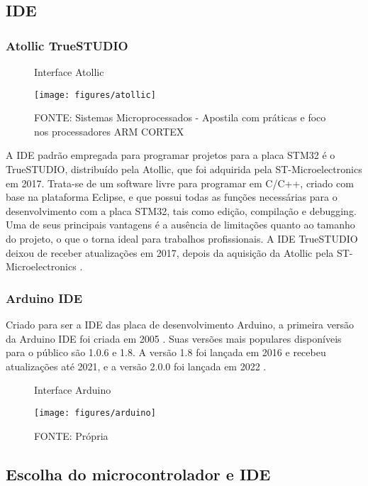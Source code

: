 \subsection{IDE}

\subsubsection{Atollic TrueSTUDIO}

\begin{figure}[ht]
	\centering
	\caption{Interface Atollic}
	\texttt{[image: figures/atollic]}
	\caption*{FONTE: Sistemas Microprocessados - Apostila com práticas e foco nos processadores ARM CORTEX \cite{apostila_microprossados}}
\end{figure}

A IDE padrão empregada para programar projetos para a placa STM32 é o TrueSTUDIO,
distribuído pela Atollic, que foi adquirida pela ST-Microelectronics em 2017.
Trata-se de um software livre para programar em C/C++, criado com base na
plataforma Eclipse, e que possui todas as funções necessárias para o
desenvolvimento com a placa STM32, tais como edição, compilação e debugging.
Uma de seus principais vantagens é a ausência de limitações quanto ao tamanho
do projeto, o que o torna ideal para trabalhos profissionais. A IDE TrueSTUDIO
deixou de receber atualizações em 2017, depois da aquisição da Atollic pela 
ST-Microelectronics \cite{apostila_microprossados}.


\subsubsection{Arduino IDE}

Criado para ser a IDE das placa de desenvolvimento Arduino, a primeira
versão da Arduino IDE foi criada em 2005 \cite{arduino_id_history}.
Suas versões mais populares disponíveis para o público são 1.0.6 e 1.8. 
A versão 1.8 foi lançada em 2016 e recebeu atualizações até 2021, 
e a versão 2.0.0 foi lançada em 2022 \cite{arduino_tag_2}.

\begin{figure}[ht]
	\centering
	\caption{Interface Arduino}
	\texttt{[image: figures/arduino]}
	\caption*{FONTE: Própria}
\end{figure}

\subsection{Escolha do microcontrolador e IDE}


